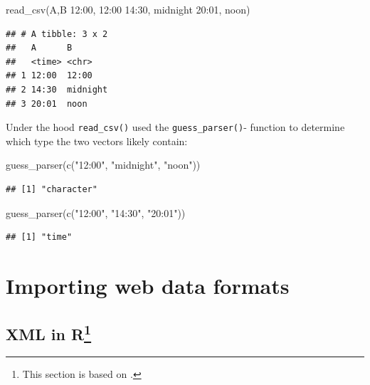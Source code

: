 \documentclass[
  12pt,
]{style/krantz}
\newenvironment{Shaded}{\begin{snugshade}}{\end{snugshade}}
\newcommand{\FunctionTok}[1]{\textcolor[rgb]{0.00,0.00,0.00}{#1}}
\newcommand{\NormalTok}[1]{#1}
\newcommand{\StringTok}[1]{\textcolor[rgb]{0.31,0.60,0.02}{#1}}
\begin{document}
\begin{Shaded}
\begin{Highlighting}[]
\FunctionTok{read\_csv}\NormalTok{(}\StringTok{\textquotesingle{}A,B}
\StringTok{         12:00, 12:00}
\StringTok{         14:30, midnight}
\StringTok{         20:01, noon\textquotesingle{}}\NormalTok{)}
\end{Highlighting}
\end{Shaded}

\begin{verbatim}
## # A tibble: 3 x 2
##   A      B       
##   <time> <chr>   
## 1 12:00  12:00   
## 2 14:30  midnight
## 3 20:01  noon
\end{verbatim}

Under the hood \texttt{read\_csv()} used the \texttt{guess\_parser()}- function to determine which type the two vectors likely contain:

\begin{Shaded}
\begin{Highlighting}[]
\FunctionTok{guess\_parser}\NormalTok{(}\FunctionTok{c}\NormalTok{(}\StringTok{"12:00"}\NormalTok{, }\StringTok{"midnight"}\NormalTok{, }\StringTok{"noon"}\NormalTok{))}
\end{Highlighting}
\end{Shaded}

\begin{verbatim}
## [1] "character"
\end{verbatim}

\begin{Shaded}
\begin{Highlighting}[]
\FunctionTok{guess\_parser}\NormalTok{(}\FunctionTok{c}\NormalTok{(}\StringTok{"12:00"}\NormalTok{, }\StringTok{"14:30"}\NormalTok{, }\StringTok{"20:01"}\NormalTok{))}
\end{Highlighting}
\end{Shaded}

\begin{verbatim}
## [1] "time"
\end{verbatim}

\hypertarget{importing-web-data-formats}{%
\section{Importing web data formats}\label{importing-web-data-formats}}

\hypertarget{xml-in-r}{%
\subsection[XML in R]{\texorpdfstring{XML in R\footnote{This section is based on \citet{umatter_2018b}.}}{XML in R}}\label{xml-in-r}}
\end{document}
